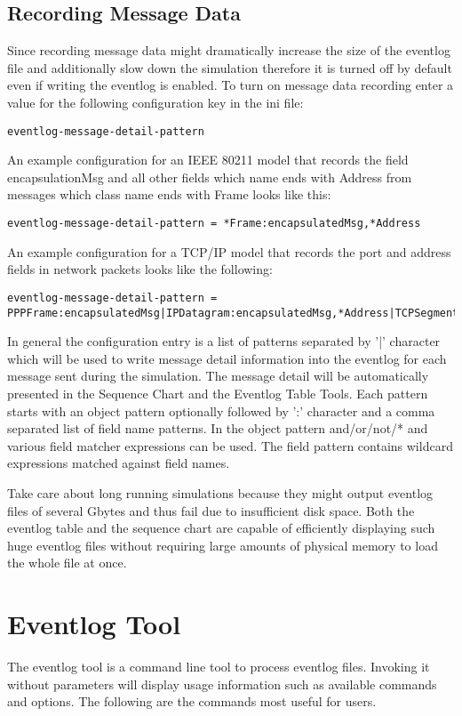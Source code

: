 \subsection{Recording Message Data}
Since recording message data might dramatically increase the size of the eventlog
file and additionally slow down the simulation therefore it is turned off by
default even if writing the eventlog is enabled. To turn on message data recording
enter a value for the following configuration key in the ini file:
\begin{verbatim}
eventlog-message-detail-pattern
\end{verbatim}
An example configuration for an IEEE 80211 model that records the field
encapsulationMsg and all other fields which name ends with Address from messages
which class name ends with Frame looks like this:
\begin{verbatim}
eventlog-message-detail-pattern = *Frame:encapsulatedMsg,*Address
\end{verbatim}
An example configuration for a TCP/IP model that records the port and address
fields in network packets looks like the following:
\begin{verbatim}
eventlog-message-detail-pattern =
PPPFrame:encapsulatedMsg|IPDatagram:encapsulatedMsg,*Address|TCPSegment:*Port
\end{verbatim}
In general the configuration entry is a list of patterns separated by '|'
character which will be used to write message detail information into the eventlog
for each message sent during the simulation. The message detail will be
automatically presented in the Sequence Chart and the Eventlog Table Tools. Each
pattern starts with an object pattern optionally followed by ':' character and a
comma separated list of field name patterns. In the object pattern and/or/not/*
and various field matcher expressions can be used. The field pattern contains
wildcard expressions matched against field names.
\begin{note}
Take care about long running simulations because they might output eventlog files
of several Gbytes and thus fail due to insufficient disk space. Both the eventlog
table and the sequence chart are capable of efficiently displaying such huge
eventlog files without requiring large amounts of physical memory to load the
whole file at once.
\end{note}

\section{Eventlog Tool}
The eventlog tool is a command line tool to process eventlog files. Invoking it
without parameters will display usage information such as available commands and
options. The following are the commands most useful for users.


